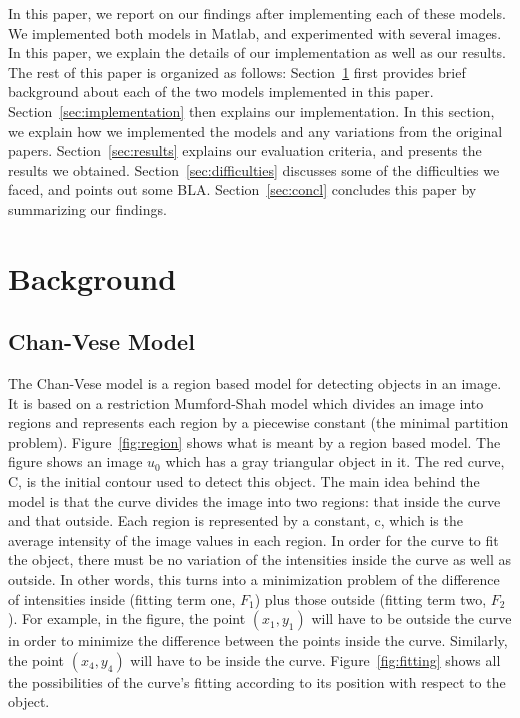 \documentclass[10pt,twocolumn,letterpaper]{article}
\begin{document}
In this paper, we report on our findings after implementing each of these models. We implemented both models in Matlab, and experimented with several images.
In this paper, we explain the details of our implementation as well as our results. The rest of this paper is organized as follows: Section~\ref{sec:bg} first
provides brief background about each of the two models implemented in this paper. Section~\ref{sec:implementation} then explains our implementation. In this
section, we explain how we implemented the models and any variations from the original papers. Section~\ref{sec:results} explains our evaluation criteria, and
presents the results we obtained. Section~\ref{sec:difficulties} discusses some of the difficulties we faced, and points out some BLA. Section~\ref{sec:concl}
concludes this paper by summarizing our findings.

\section{Background}
\label{sec:bg}

\subsection{Chan-Vese Model}
\label{sec:chan-vese}

The Chan-Vese model is a region based model for detecting objects in an image. It is based on a restriction Mumford-Shah model which divides an image into
regions and represents each region by a piecewise constant (the minimal partition problem). Figure~\ref{fig:region} shows what is meant by a region based
model. The figure shows an image $u_{0}$ which has a gray triangular object in it. The red curve, C, is the initial contour used to detect this object. The
main idea behind the model is that the curve divides the image into two regions: that inside the curve and that outside. Each region is represented by a
constant, c, which is the average intensity of the image values in each region. In order for the curve to fit the object, there must be no variation of the
intensities inside the curve as well as outside. In other words, this turns into a minimization problem of the difference of intensities inside (fitting term
one, $F_{1}$) plus those
outside (fitting term two, $F_{2}$). For example, in the figure, the point $(x_{1},y_{1})$ will have to be outside the curve in order to minimize the difference
between the points inside
the curve. Similarly, the point $(x_{4}, y_{4})$ will have to be inside the curve. Figure~\ref{fig:fitting} shows all the possibilities of the curve's fitting
according to its position with respect to the object.
\end{document}

